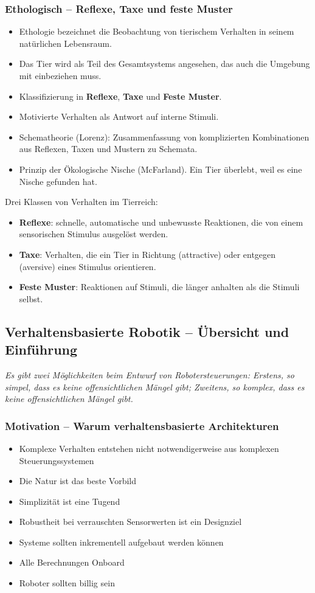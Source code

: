 \subsubsection{Ethologisch -- Reflexe, Taxe und feste Muster}
\begin{itemize}
	\item Ethologie bezeichnet die Beobachtung von tierischem Verhalten in seinem natürlichen Lebensraum.
	\item Das Tier wird als Teil des Gesamtsystems angesehen, das auch die Umgebung mit einbeziehen muss.
	\item Klassifizierung in \textbf{Reflexe}, \textbf{Taxe} und \textbf{Feste  Muster}.
	\item Motivierte Verhalten als Antwort auf interne Stimuli.
	\item Schematheorie (Lorenz): Zusammenfassung von komplizierten Kombinationen aus Reflexen, Taxen und Mustern zu Schemata.
	\item Prinzip der \glqq Ökologische Nische \grqq (McFarland). Ein Tier überlebt, weil es eine Nische gefunden hat.
\end{itemize}

Drei Klassen von Verhalten im Tierreich:
\begin{itemize}
	\item \textbf{Reflexe}: schnelle, automatische und unbewusste Reaktionen, die von einem sensorischen Stimulus ausgelöst werden.
	\item \textbf{Taxe}: Verhalten, die ein Tier in Richtung (attractive) oder entgegen (aversive) eines Stimulus orientieren.
	\item \textbf{Feste Muster}: Reaktionen auf Stimuli, die länger anhalten als die Stimuli selbst.
\end{itemize}

\subsection{Verhaltensbasierte Robotik -- Übersicht  und Einführung}
\emph{Es gibt zwei Möglichkeiten beim Entwurf von Robotersteuerungen: Erstens, so simpel, dass es keine offensichtlichen Mängel gibt; Zweitens, so komplex, dass es keine offensichtlichen Mängel gibt.}
\subsubsection{Motivation -- Warum verhaltensbasierte Architekturen}
\begin{itemize}
	\item Komplexe Verhalten entstehen nicht notwendigerweise aus komplexen Steuerungssystemen
	\item Die Natur ist das beste Vorbild
	\item Simplizität ist eine Tugend
	\item Robustheit bei verrauschten Sensorwerten ist ein Designziel
	\item Systeme sollten inkrementell aufgebaut werden können
	\item Alle Berechnungen Onboard
	\item Roboter sollten billig sein
\end{itemize}

